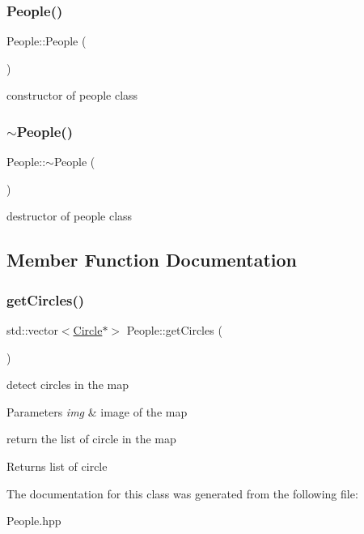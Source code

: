 \subsubsection{\texorpdfstring{People()}{People()}}
{\footnotesize\ttfamily People\+::\+People (\begin{DoxyParamCaption}{ }\end{DoxyParamCaption})}

constructor of people class \mbox{\label{class_people_adae124857f64dadff4e1801410b3dab2}} 
\subsubsection{\texorpdfstring{$\sim$\+People()}{~People()}}
{\footnotesize\ttfamily People\+::$\sim$\+People (\begin{DoxyParamCaption}{ }\end{DoxyParamCaption})}

destructor of people class 

\subsection{Member Function Documentation}
\mbox{\label{class_people_a55604e9d3aa4a772b5d8d97ead9493b0}} 
\subsubsection{\texorpdfstring{get\+Circles()}{getCircles()}}
{\footnotesize\ttfamily std\+::vector$<$\mbox{\hyperlink{class_geometry2_d_1_1_circle}{Circle}}$\ast$$>$ People\+::get\+Circles (\begin{DoxyParamCaption}{ }\end{DoxyParamCaption})}

detect circles in the map 
\begin{DoxyParams}{Parameters}
{\em img} & image of the map\\
\hline
\end{DoxyParams}
return the list of circle in the map \begin{DoxyReturn}{Returns}
list of circle 
\end{DoxyReturn}


The documentation for this class was generated from the following file\+:\begin{DoxyCompactItemize}
\item 
People.\+hpp\end{DoxyCompactItemize}

